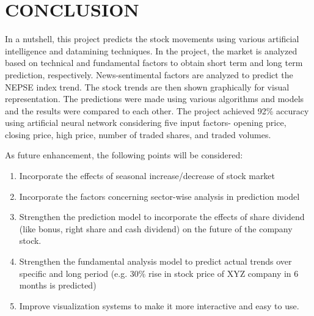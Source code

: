 \section{CONCLUSION}
In a nutshell, this project predicts the stock movements using various artificial intelligence and datamining techniques. In the project, the market is analyzed based on technical and fundamental factors to obtain short term and long term prediction, respectively. News-sentimental factors are analyzed to predict the NEPSE index trend. The stock trends are then shown graphically for visual representation. The predictions were made using various algorithms and models and the results were compared to each other. The project achieved 92\% accuracy using artificial neural network considering five input factors- opening price, closing price, high price, number of traded shares, and traded volumes. 

As future enhancement, the following points will be considered:
\begin{enumerate}
	\item Incorporate the effects of seasonal increase/decrease of stock market 
	\item Incorporate the factors concerning sector-wise analysis in prediction model
	\item Strengthen the prediction model to incorporate the effects of share dividend (like bonus, right share and cash dividend) on the future of the company stock.
	\item Strengthen the fundamental analysis model to predict actual trends over specific and long period (e.g. 30\% rise in stock price of XYZ company in 6 months is predicted) 
	\item Improve visualization systems to make it more interactive and easy to use. 

\end{enumerate}

